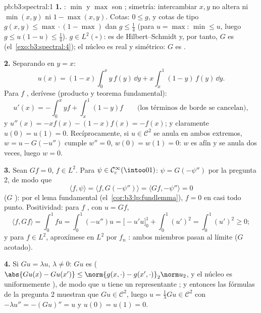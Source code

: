 \begin{solution}{pb:b3:spectral:1}
\textbf{1.} : $\min$ y
$\max$ son ; simetría:
intercambiar $x, y$ no altera ni $\min(x,y)$ ni $1 -
\max(x,y)$. Cotas: $0 \leq g$, y cotas de tipo $g(x,y) \leq
\max\cdot(1-\max)$ dan $g \leq \frac14$ (para $u
= \max$: $\min \leq u$, luego $g \leq u(1-u) \leq \frac14$). $g
\in L^2(\square)$: es de Hilbert--Schmidt y, por tanto, $G$ es
(el~\cref{exo:b3:spectral:4}); el núcleo es real y simétrico: $G$ es
.

\textbf{2.} Separando en $y = x$:
\[
u(x) = (1 - x)\int_0^x y\,f(y)\,\dd y +
x\int_x^1(1 - y)\,f(y)\,\dd y .
\]
Para $f$ , derívese
(producto y teorema fundamental):
\[
u'(x) = -\int_0^xyf + \int_x^1(1-y)f
\qquad\text{(los términos de borde se cancelan)},
\]
y $u''(x) = -xf(x) - (1 - x)f(x) = -f(x)$; y claramente $u(0) =
u(1) = 0$. Recíprocamente, si $u \in \mathcal C^2$ se anula en ambos
extremos, $w = u - G(-u'')$ cumple $w'' = 0$, $w(0) = w(1) =
0$: $w$ es afín y se anula dos veces, luego $w = 0$.

\textbf{3.} Sean $Gf = 0$, $f \in L^2$. Para $\psi \in \mathcal
C_c^\infty(\intoo01)$: $\psi = G(-\psi'')$ por la pregunta 2, de modo
que
\[
\langle f, \psi\rangle = \langle f, G(-\psi'')\rangle
= \langle Gf, -\psi''\rangle = 0
\]
($G$ ): por el lema
fundamental (el~\cref{cor:b3:lp:fundlemma}), $f = 0$ en casi todo punto.
Positividad: para $f$ , con
$u = Gf$,
\[
\langle f, Gf\rangle = \int_0^1 fu = \int_0^1(-u'')u
= \bigl[-u'u\bigr]_0^1 + \int_0^1(u')^2 = \int_0^1(u')^2
\geq 0 ;
\]
y para $f \in L^2$, aproxímese en $L^2$ por $f_n$
: ambos miembros pasan al
límite ($G$ acotado).

\textbf{4.} Si $Gu = \lambda u$, $\lambda \neq 0$: $Gu$ es
($\abs{Gu(x) - Gu(x')} \leq \norm{g(x,\cdot) -
g(x',\cdot)}_2\norm u_2$, y el núcleo es uniformemente
), de modo que $u$ tiene un
representante ; y entonces
las fórmulas de la pregunta 2 muestran que $Gu \in \mathcal C^2$, luego
$u =
\frac1\lambda Gu \in \mathcal C^2$ con $-\lambda u'' =
-(Gu)'' = u$ y $u(0) = u(1) = 0$.


\end{solution}
